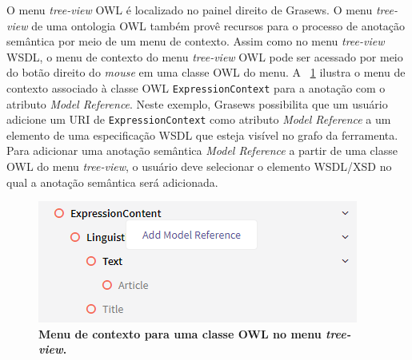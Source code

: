 O menu \textit{tree-view} OWL é localizado no painel direito de Grasews. O menu \textit{tree-view} de uma ontologia OWL também provê recursos para o processo de anotação semântica por meio de um menu de contexto. Assim como no menu \textit{tree-view} WSDL, o menu de contexto do menu \textit{tree-view} OWL pode ser acessado por meio do botão direito do \textit{mouse} em uma classe OWL do menu. A \figurename~\ref{fig:grasews-menu-owl-contexto} ilustra o menu de contexto associado à classe OWL \texttt{ExpressionContext} para a anotação com o atributo \textit{Model Reference}. Neste exemplo, Grasews possibilita que um usuário adicione um URI de \texttt{ExpressionContext} como atributo \textit{Model Reference} a um elemento de uma especificação WSDL que esteja visível no grafo da ferramenta. Para adicionar uma anotação semântica \textit{Model Reference} a partir de uma classe OWL do menu \textit{tree-view}, o usuário deve selecionar o elemento WSDL/XSD no qual a anotação semântica será adicionada.

\begin{figure}[h]
    \includegraphics[scale=0.7]{4-grasews/imagens/grasews-menu-owl-contexto.png}
    \centering
    \caption[Menu de contexto para uma classe OWL no menu \textit{tree-view}]{\textbf{Menu de contexto para uma classe OWL no menu \textit{tree-view}.}}
    \label{fig:grasews-menu-owl-contexto}
\end{figure}